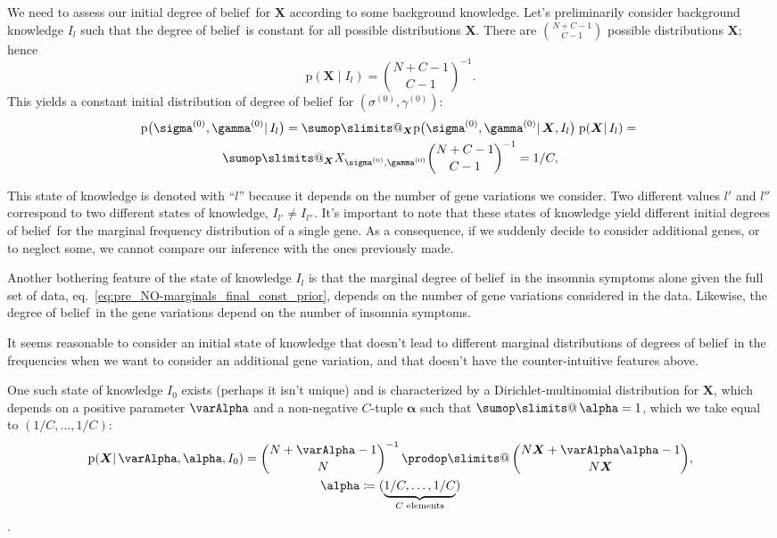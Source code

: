 \documentclass[\ifafour a4paper,12pt,\else a5paper,10pt,\fi%
onecolumn,oneside,article,%
british%
]{memoir}
\makeatletter
\theoremstyle{remark}
\theoremstyle{innote}
\def\sum{\DOTSI\sumop\slimits@}
\def\prod{\DOTSI\prodop\slimits@}
\newcommand*{\citep}{\parencites}
\newcommand*{\defd}{\coloneqq}
\newcommand*{\pf}{\mathrm{p}}%
\renewcommand*{\|}{\mathpunct{|}}
\newcommand*{\sect}{\S}%
\newcommand*{\sects}{\S\S}%
\newcommand*{\eqn}{eq.}%
\newcommand*{\tprod}{\mathop{\textstyle\prod}\nolimits}
\newcommand*{\tsum}{\mathop{\textstyle\sum}\nolimits}
\newcommand*{\puzzle}{\maltese}
\newcommand{\mynote}[1]{ {\color{notecolour}\puzzle\ #1}}
\newcommand*{\dob}{degree of belief}
\newcommand*{\dobs}{degrees of belief}
\newcommand*{\yI}{I}
\newcommand*{\ysum}{\tsum}
\newcommand*{\yprod}{\tprod}
\newcommand*{\ys}{\sigma}
\newcommand*{\yg}{\gamma}
\newcommand*{\gn}{l}
\newcommand*{\ysi}[1]{\ys^{(#1)}}
\newcommand*{\ygi}[1]{\yg^{(#1)}}
\newcommand*{\yso}{\ysi{0}}
\newcommand*{\ygo}{\ygi{0}}
\newcommand*{\yF}{\bm{X}}
\newcommand*{\yIc}{I_{\gn}}
\newcommand*{\yIo}{I_{0}}
\newcommand*{\yA}{\varAlpha}
\newcommand*{\ya}{\bm{\alpha}}
\makeatother
\begin{document}

We need to assess our initial \dob\ for $\yF$ according to some
background knowledge. Let's preliminarily consider background
knowledge $\yIc$ such that the \dob\ is constant for all possible
distributions $\yF$. There are $\binom{N+C-1}{C-1}$ possible distributions
$\yF$; hence
\begin{equation}
  \label{eq:pre_NO-constant_prior}
  \pf(\yF \| \yIc) = \binom{N+C-1}{C-1}^{-1}.
\end{equation}
This yields a constant  initial  distribution of \dob\ for $(\yso,\ygo)$:
\begin{multline}
  \label{eq:pre_NO-joint_prob_initial_F_unknown}
  \pf\bigl(\yso, \ygo \| \yIc\bigr)  =
  \sum_{\yF}  \pf\bigl(\yso, \ygo \| \yF,\yIc\bigr) \;
  \pf( \yF \| \yIc) ={}\\
  \sum_{\yF}  X_{\yso, \ygo} \binom{N+C-1}{C-1}^{-1}
  = 1/C,
\end{multline}

This state of knowledge is denoted with \enquote{$\gn$} because it depends
on the number of gene variations we consider. Two different values $\gn'$
and $\gn''$ correspond to two different states of knowledge,
$\yI_{\gn'} \ne \yI_{\gn''}$. It's important to note that these states of
knowledge yield different initial \dobs\ for the marginal frequency
distribution of a single gene. As a consequence, if we suddenly decide to
consider additional genes, or to neglect some, we cannot compare our
inference with the ones previously made.

Another bothering feature of the state of knowledge $\yIc$ is that the
marginal \dob\ in the insomnia symptoms alone given the full set of
data, \eqn~\eqref{eq:pre_NO-marginals_final_const_prior}, depends on the number of
gene variations considered in the data. Likewise, the \dob\ in the
gene variations depend on the number of insomnia symptoms.

It seems reasonable to consider an initial state of knowledge that doesn't
lead to different marginal distributions of \dobs\ in the frequencies when
we want to consider an additional gene variation, and that doesn't have
the counter-intuitive features above.

One such state of knowledge $\yIo$ exists (perhaps it isn't unique) and is
characterized by a Dirichlet-multinomial distribution for $\yF$, which
depends on a positive parameter $\yA$ and a non-negative $C$-tuple $\ya$
such that $\ysum\ya=1$, which we take equal to $(1/C,\dotsc,1/C)$:
\begin{multline}
  \label{eq:pre_NO-dirichlet_prior}
  \pf(\yF \| \yA, \ya,\yIo) =
  \binom{N+\yA-1}{N}^{-1} \yprod\binom{N\yF+\yA\ya-1}{N\yF},\\
  \ya \defd (\underbrace{1/C,\dotsc,1/C}_{\text{$C$ elements}})
\end{multline}
\citep[\sect~13.1]{johnsonetal1969_r1996}[\sect~3]{minka2000_r2012}[and
especially][\sects~3--4]{basuetal1982}.
\end{document}

